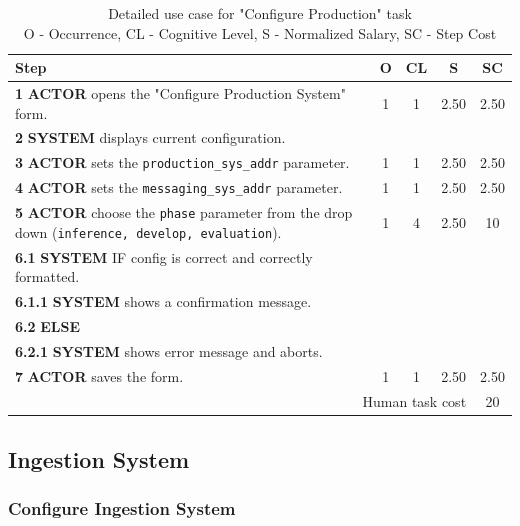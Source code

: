\begin{table}[H]
    \centering
    \begin{tabularx}{\textwidth}{|X|c|c|c|c|}
    \hline
    \textbf{Step} & \textbf{O} & \textbf{CL} & \textbf{S} & \textbf{SC} \\
    \hline
    \textbf{1} \textbf{ACTOR} opens the "Configure Production System" form. & 1 & 1 & 2.50 & 2.50 \\
    \hline
    \textbf{2} \textbf{SYSTEM} displays current configuration. & & & & \\
    \hline
    \textbf{3} \textbf{ACTOR} sets the \texttt{production\_sys\_addr} parameter. & 1 & 1 & 2.50 & 2.50 \\
    \hline
    \textbf{4} \textbf{ACTOR} sets the \texttt{messaging\_sys\_addr} parameter. &  1 & 1 & 2.50 & 2.50 \\
    \hline
    \textbf{5} \textbf{ACTOR} choose the \texttt{phase} parameter from the drop down (\texttt{inference, develop, evaluation}). & 1 & 4 & 2.50 & 10 \\
    \hline
    \textbf{6.1} \textbf{SYSTEM} IF config is correct and correctly formatted. & & & & \\
    \hline
    \textbf{6.1.1} \textbf{SYSTEM} shows a confirmation message. & & & & \\
    \hline
    \textbf{6.2} \textbf{ELSE} & & & & \\
    \hline
    \textbf{6.2.1} \textbf{SYSTEM} shows error message and aborts. & & & & \\
    \hline
    \textbf{7} \textbf{ACTOR} saves the form. & 1 & 1 & 2.50 & 2.50 \\
    \hline
    \multicolumn{4}{|r|}{Human task cost} & 20 \\
    \hline
    \end{tabularx}
    
    \caption{Detailed use case for "Configure Production" task\\ 
    O - Occurrence, CL - Cognitive Level, S - Normalized Salary, SC - Step Cost}
    \label{table:configure_production_system}
    \end{table}



\subsection{Ingestion System}

\subsubsection{Configure Ingestion System}

